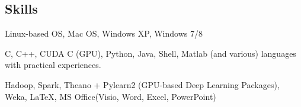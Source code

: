 \documentclass[]{article}
\renewenvironment{description}{
  \begin{basedescript}{\desclabelstyle{\pushlabel}\desclabelwidth{10em}}
}{
  \end{basedescript}
}
\begin{document}
\subsection{Skills}\label{skills}

\begin{description}
\item[Operating System]
Linux-based OS, Mac OS, Windows XP, Windows 7/8
\item[Programming Language]
C, C++, CUDA C (GPU), Python, Java, Shell, Matlab (and various)
languages with practical experiences.
\item[Others]
Hadoop, Spark, Theano + Pylearn2 (GPU-based Deep Learning Packages),
Weka, \LaTeX, MS Office(Visio, Word, Excel, PowerPoint)
\end{description}
\end{document}
